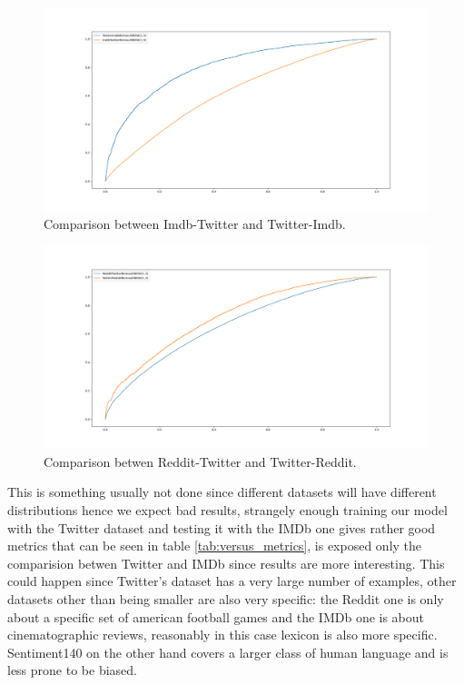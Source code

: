 \begin{figure}[h!t]
    \centering
    \includegraphics[scale=0.25]{../experiments/plots/ImdbTwitter}
    \caption{Comparison between Imdb-Twitter and Twitter-Imdb.}
    \label{fig:TwitterImdb}        
\end{figure}

\begin{figure}[h!t]
    \centering
    \includegraphics[scale=0.25]{../experiments/plots/RedditTwitter}
    \caption{Comparison betwen Reddit-Twitter and Twitter-Reddit.}
    \label{fig:TwitterReddit}
\end{figure}

This is something usually not done since different datasets will have different distributions hence we expect bad results, strangely enough training our model with the Twitter dataset and testing it with the IMDb one gives rather good metrics that can be seen in table \ref{tab:versus_metrics}, is exposed only the comparision betwen Twitter and IMDb since results are more interesting. 
This could happen since Twitter's dataset has a very large number of examples, other datasets other than being smaller are also very specific: the Reddit one is only about a specific set of american football games and the IMDb one is about cinematographic reviews, reasonably in this case lexicon is also more specific. 
Sentiment140 on the other hand covers a larger class of human language and is less prone to be biased.

